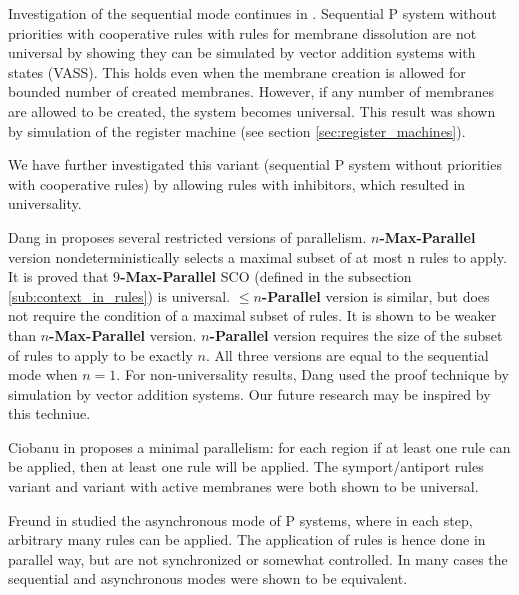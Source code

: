 Investigation of the sequential mode continues in \cite{Dang:2005:Sequential}. Sequential P system without priorities with cooperative rules with rules for membrane dissolution are not universal by showing they can be simulated by vector addition systems with states (VASS).
This holds even when the membrane creation is allowed for bounded number of created membranes. However, if any number of membranes are allowed to be created, the system becomes universal. This result was shown by simulation of the register machine (see section \ref{sec:register_machines}).


We have further investigated this variant (sequential P system without priorities with cooperative rules) by allowing rules with inhibitors, which resulted in universality.



Dang in \cite{Ibarra04dang} proposes several restricted versions of parallelism.
$n${\bf -Max-Parallel} version nondeterministically selects a maximal subset of at most n rules to apply. It is proved that 9{\bf -Max-Parallel} SCO (defined in the subsection \ref{sub:context_in_rules}) is universal.
$\leq n${\bf -Parallel} version is similar, but does not require the condition of a maximal subset of rules. It is shown to be weaker than $n${\bf -Max-Parallel} version.
$n${\bf -Parallel} version requires the size of the subset of rules to apply to be exactly $n$.
All three versions are equal to the sequential mode when $n=1$. For non-universality results, Dang used the proof technique by simulation by vector addition systems. Our future research may be inspired by this techniue.


Ciobanu in \cite{Ciobanu:2007:MinimalParallelism} proposes a minimal parallelism: for each region if at least one rule can be applied, then at least one rule will be applied. The symport/antiport rules variant and variant with active membranes were both shown to be universal.


Freund in \cite{Freund:2004:Async} studied the asynchronous mode of P systems, where in each step, arbitrary many rules can be applied. The application of rules is hence done in parallel way, but are not synchronized or somewhat controlled. In many cases the sequential and asynchronous modes were shown to be equivalent.

